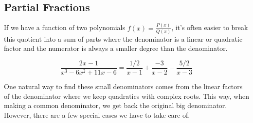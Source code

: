 \subsection{Partial Fractions}
\noindent
If we have a function of two polynomials $f(x) = \frac{P(x)}{Q(x)}$, it's often easier to break this quotient into a sum of parts where the denominator is a linear or quadratic factor and the numerator is always a smaller degree than the denominator.
\begin{example}
	\begin{equation*}
		\frac{2x-1}{x^3-6x^2+11x-6} = \frac{1/2}{x-1}+\frac{-3}{x-2}+\frac{5/2}{x-3}
	\end{equation*}
\end{example}

\noindent
One natural way to find these small denominators comes from the linear factors of the denominator where we keep quadratics with complex roots. This way, when making a common denominator, we get back the original big denominator. However, there are a few special cases we have to take care of.






